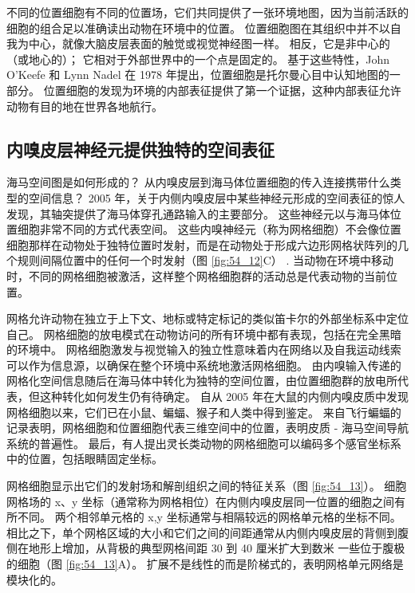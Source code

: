 不同的位置细胞有不同的位置场，它们共同提供了一张环境地图，因为当前活跃的细胞的组合足以准确读出动物在环境中的位置。 位置细胞图在其组织中并不以自我为中心，就像大脑皮层表面的触觉或视觉神经图一样。 相反，它是非中心的（或地心的）； 它相对于外部世界中的一个点是固定的。 基于这些特性，John O’Keefe 和 Lynn Nadel 在 1978 年提出，位置细胞是托尔曼心目中认知地图的一部分。 位置细胞的发现为环境的内部表征提供了第一个证据，这种内部表征允许动物有目的地在世界各地航行。

\subsection{内嗅皮层神经元提供独特的空间表征}
海马空间图是如何形成的？ 从内嗅皮层到海马体位置细胞的传入连接携带什么类型的空间信息？ 2005 年，关于内侧内嗅皮层中某些神经元形成的空间表征的惊人发现，其轴突提供了海马体穿孔通路输入的主要部分。 这些神经元以与海马体位置细胞非常不同的方式代表空间。 这些内嗅神经元（称为网格细胞）不会像位置细胞那样在动物处于独特位置时发射，而是在动物处于形成六边形网格状阵列的几个规则间隔位置中的任何一个时发射（图 \ref{fig:54_12}C） . 当动物在环境中移动时，不同的网格细胞被激活，这样整个网格细胞群的活动总是代表动物的当前位置。

网格允许动物在独立于上下文、地标或特定标记的类似笛卡尔的外部坐标系中定位自己。 网格细胞的放电模式在动物访问的所有环境中都有表现，包括在完全黑暗的环境中。 网格细胞激发与视觉输入的独立性意味着内在网络以及自我运动线索可以作为信息源，以确保在整个环境中系统地激活网格细胞。 由内嗅输入传递的网格化空间信息随后在海马体中转化为独特的空间位置，由位置细胞群的放电所代表，但这种转化如何发生仍有待确定。 自从 2005 年在大鼠的内侧内嗅皮质中发现网格细胞以来，它们已在小鼠、蝙蝠、猴子和人类中得到鉴定。 来自飞行蝙蝠的记录表明，网格细胞和位置细胞代表三维空间中的位置，表明皮质 - 海马空间导航系统的普遍性。 最后，有人提出灵长类动物的网格细胞可以编码多个感官坐标系中的位置，包括眼睛固定坐标。

网格细胞显示出它们的发射场和解剖组织之间的特征关系（图 \ref{fig:54_13}）。 细胞网格场的 x、y 坐标（通常称为网格相位）在内侧内嗅皮层同一位置的细胞之间有所不同。 两个相邻单元格的 x,y 坐标通常与相隔较远的网格单元格的坐标不同。 相比之下，单个网格区域的大小和它们之间的间距通常从内侧内嗅皮层的背侧到腹侧在地形上增加，从背极的典型网格间距 30 到 40 厘米扩大到数米 一些位于腹极的细胞（图 \ref{fig:54_13}A）。 扩展不是线性的而是阶梯式的，表明网格单元网络是模块化的。


